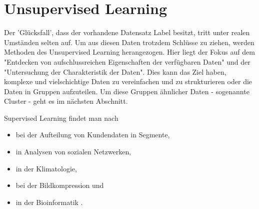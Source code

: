 \section{Unsupervised Learning}\label{sec:us1}
Der 'Glücksfall', dass der vorhandene Datensatz Label besitzt, tritt unter realen Umständen selten auf. Um aus diesen Daten trotzdem Schlüsse zu ziehen, werden Methoden des Unsupervised Learning herangezogen. Hier liegt der Fokus auf dem "Entdecken von aufschlussreichen Eigenschaften der verfügbaren Daten"\citep[S.277; eigene Übersetzung]{kubat_introduction_2017} und der "Untersuchung der Charakteristik der Daten"\citep[S.~13; eigene Übersetzung]{kim_matlab_2017}. Dies kann das Ziel haben, komplexe und vielschichtige Daten zu vereinfachen und zu strukturieren\citep{ericson_how_2017} oder die Daten in Gruppen aufzuteilen\citep[S.~22]{lison_introduction_2012}. Um diese Gruppen ähnlicher Daten - sogenannte Cluster - geht es im nächsten Abschnitt.\par
Supervised Learning findet man nach \citep[S.~223]{ramasubramanian_machine_2017}
\begin{itemize}
\item bei der Aufteilung von Kundendaten in Segmente,
\item in Analysen von sozialen Netzwerken,
\item in der Klimatologie,
\item bei der Bildkompression und
\item in der Bioinformatik \citep[S.~6]{kauchak_neural_2016}.
\end{itemize}

